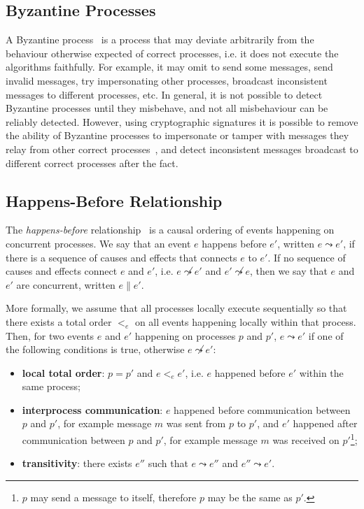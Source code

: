 \documentclass[9pt, oneside]{article}   	%
\begin{document}
\subsection{Byzantine Processes}

A Byzantine process~\cite{lamport2019byzantinegenerals} is a process that may deviate arbitrarily from the behaviour otherwise expected of correct processes, i.e. it does not execute the algorithms faithfully. For example, it may omit to send some messages, send invalid messages, try impersonating other processes, broadcast inconsistent messages to different processes, etc. In general, it is not possible to detect Byzantine processes until they misbehave, and not all misbehaviour can be reliably detected. However, using cryptographic signatures it is possible to remove the ability of Byzantine processes to impersonate or tamper with messages they relay from other correct processes~\cite{lamport2019byzantinegenerals}, and detect inconsistent messages broadcast to different correct processes after the fact.

\subsection{Happens-Before Relationship}
\label{sec:background:happens-before}

The \textit{happens-before} relationship~\cite{lamport2019time} is a causal ordering of events happening on concurrent processes. We say that an event $e$ happens before $e'$, written $e \leadsto e'$, if there is a sequence of causes and effects that connects $e$ to $e'$. If no sequence of causes and effects connect $e$ and $e'$, i.e. $e \not\leadsto e'$ and $e' \not\leadsto e$, then we say that $e$ and $e'$ are concurrent, written $e \parallel e'$.

More formally, we assume that all processes locally execute sequentially so that there exists a total order $<_e$ on all events happening locally within that process. Then, for two events $e$ and $e'$ happening on processes $p$ and $p'$, $e \leadsto e'$ if one of the following conditions is true, otherwise $e \not\leadsto e'$:
\begin{itemize}
	\item \textbf{local total order}: $p=p'$ and $e <_e e'$, i.e. $e$ happened before $e'$ within the same process;
	\item \textbf{interprocess communication}: $e$ happened before communication between $p$ and $p'$, for example message $m$ was sent from $p$ to $p'$, and $e'$ happened after communication between $p$ and $p'$, for example message $m$ was received on $p'$\footnote{$p$ may send a message to itself, therefore $p$ may be the same as $p'$.};
	\item \textbf{transitivity}: there exists $e''$ such that $e \leadsto e''$ and $e'' \leadsto e'$.
\end{itemize}
\end{document}

